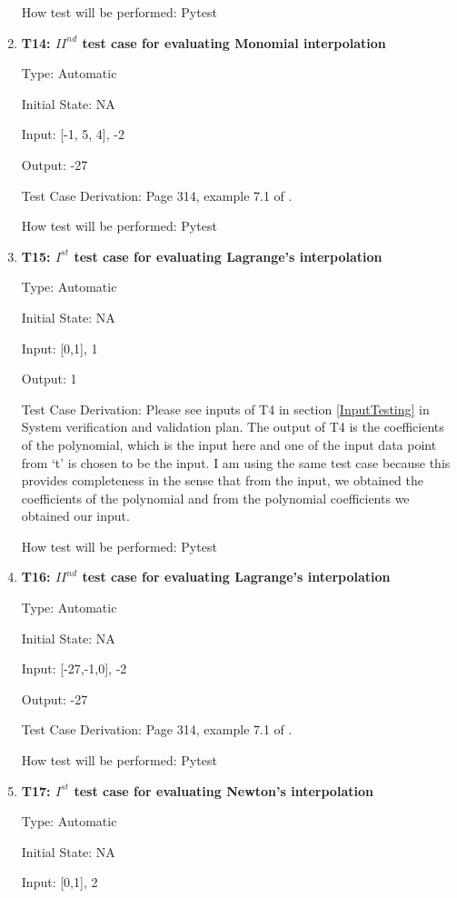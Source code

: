 \documentclass[12pt, titlepage]{article}
\begin{document}
\begin{enumerate}
How test will be performed: Pytest



\item{\textbf{T14: ${II}^{nd}$ test case for evaluating Monomial interpolation}}

Type: Automatic

Initial State: NA 

Input: [-1, 5, 4], -2 

Output: -27

Test Case Derivation: Page 314, example 7.1 of \cite{Health1997}. 

How test will be performed: Pytest



\item{\textbf{T15: $I^{st}$ test case for evaluating Lagrange's interpolation}}

Type: Automatic

Initial State: NA 

Input: [0,1], 1 

Output: 1

Test Case Derivation: Please see inputs of T4 in section \ref{InputTesting} in 
System verification and validation plan. The output of T4 is the coefficients 
of the polynomial, which is the input here and one of the input data point from 
`t' is chosen to be the input. I am using the same test case because this 
provides completeness in the sense that from the input, we obtained the 
coefficients of the polynomial and from the polynomial coefficients we obtained 
our input.

How test will be performed: Pytest

\item{\textbf{T16: ${II}^{nd}$ test case for evaluating Lagrange's 
interpolation}}

Type: Automatic

Initial State: NA 

Input: [-27,-1,0], -2 

Output: -27

Test Case Derivation: Page 314, example 7.1 of \cite{Health1997}. 

How test will be performed: Pytest

\item{\textbf{T17: $I^{st}$ test case for evaluating Newton's interpolation}}

Type: Automatic

Initial State: NA 

Input: [0,1], 2 


\end{enumerate}
\end{document}
